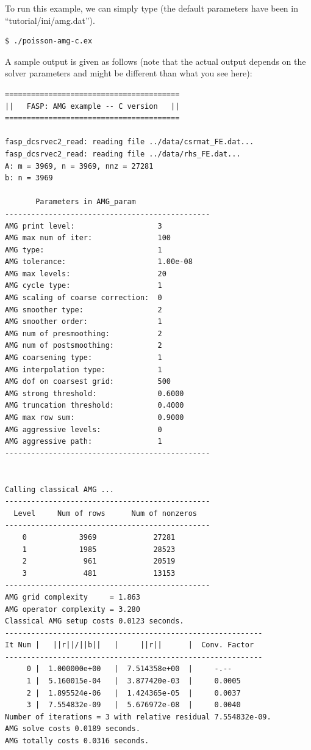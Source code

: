 \documentclass[11pt]{memoir}
\begin{document}
%
To run this example, we can simply type (the default parameters have been in ``tutorial/ini/amg.dat'').
%
\begin{lstlisting}[numbers=none]
$ ./poisson-amg-c.ex
\end{lstlisting}
%
A sample output is given as follows (note that the actual output depends on the solver parameters and might be different than what you see here):
\begin{lstlisting}[numbers=none]
========================================
||   FASP: AMG example -- C version   ||
========================================

fasp_dcsrvec2_read: reading file ../data/csrmat_FE.dat...
fasp_dcsrvec2_read: reading file ../data/rhs_FE.dat...
A: m = 3969, n = 3969, nnz = 27281
b: n = 3969

       Parameters in AMG_param
-----------------------------------------------
AMG print level:                   3
AMG max num of iter:               100
AMG type:                          1
AMG tolerance:                     1.00e-08
AMG max levels:                    20
AMG cycle type:                    1
AMG scaling of coarse correction:  0
AMG smoother type:                 2
AMG smoother order:                1
AMG num of presmoothing:           2
AMG num of postsmoothing:          2
AMG coarsening type:               1
AMG interpolation type:            1
AMG dof on coarsest grid:          500
AMG strong threshold:              0.6000
AMG truncation threshold:          0.4000
AMG max row sum:                   0.9000
AMG aggressive levels:             0
AMG aggressive path:               1
-----------------------------------------------


Calling classical AMG ...
-----------------------------------------------
  Level     Num of rows      Num of nonzeros
-----------------------------------------------
    0            3969             27281
    1            1985             28523
    2             961             20519
    3             481             13153
-----------------------------------------------
AMG grid complexity     = 1.863
AMG operator complexity = 3.280
Classical AMG setup costs 0.0123 seconds.
-----------------------------------------------------------
It Num |   ||r||/||b||   |     ||r||      |  Conv. Factor
-----------------------------------------------------------
     0 |  1.000000e+00   |  7.514358e+00  |     -.--
     1 |  5.160015e-04   |  3.877420e-03  |     0.0005
     2 |  1.895524e-06   |  1.424365e-05  |     0.0037
     3 |  7.554832e-09   |  5.676972e-08  |     0.0040
Number of iterations = 3 with relative residual 7.554832e-09.
AMG solve costs 0.0189 seconds.
AMG totally costs 0.0316 seconds.
\end{lstlisting}
\end{document}
